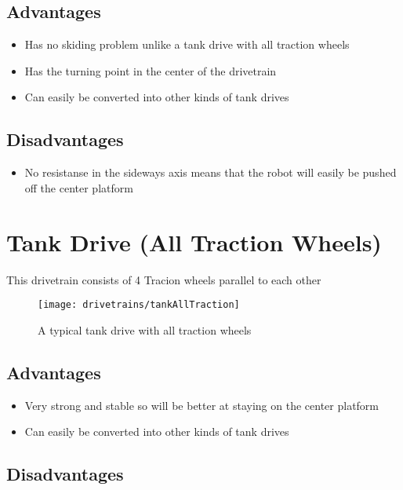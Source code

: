 \documentclass[../../main.tex]{subfiles}
\begin{document}
\subsection{Advantages} 

\begin{itemize} \item Has no skiding problem unlike a tank drive with all traction wheels \item Has the turning point in the center of the drivetrain \item Can easily be converted into other kinds of tank drives \end{itemize} 

\subsection{Disadvantages} 

\begin{itemize} \item No resistanse in the sideways axis means that the robot will easily be pushed off the center platform \end{itemize} 

\section{Tank Drive (All Traction Wheels)} 

This drivetrain consists of 4 Tracion wheels parallel to each other 

\begin{figure}[h] \centering 

	\texttt{[image: drivetrains/tankAllTraction]} \caption{A typical tank drive with all traction wheels} \label{fig:drivetrainTankAllTraction} \end{figure} 

\subsection{Advantages} 

\begin{itemize} \item Very strong and stable so will be better at staying on the center platform \item Can easily be converted into other kinds of tank drives \end{itemize} 

\subsection{Disadvantages} 
\end{document}
